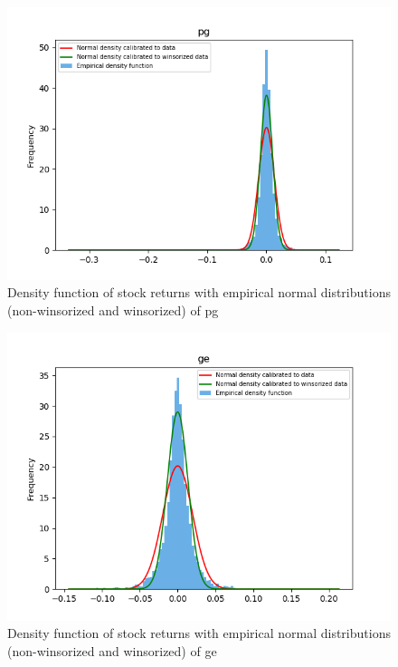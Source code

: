 \documentclass[10pt]{article}
\newenvironment{exercise}[2][Exercise]{\begin{trivlist}
  \item[\hskip \labelsep {\bfseries #1}\hskip \labelsep {\bfseries #2.}]}{\end{trivlist}}
\begin{document}
\begin{exercise}{3}
\begin{figure}[H]
		\end{figure}
		
		\begin{figure}[H]
	
			\centering
			\includegraphics[scale=0.7]{Figures/ex3_pg.png}	
			\caption{Density function of stock returns with empirical normal distributions (non-winsorized and winsorized) of pg}	
			\label{fig:ex3_pg}
	
		\end{figure}
		
		\begin{figure}[H]
	
			\centering
			\includegraphics[scale=0.7]{Figures/ex3_ge.png}	
			\caption{Density function of stock returns with empirical normal distributions (non-winsorized and winsorized) of ge}	
			\label{fig:ex3_ge}
	

\end{figure}
\end{exercise}
\end{document}
